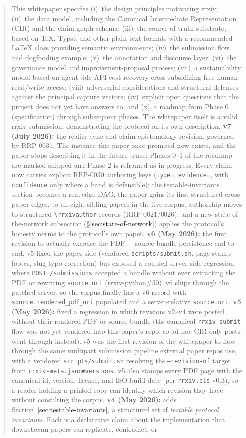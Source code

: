 \documentclass[11pt]{rrxiv}
\begin{document}
\begin{abstract}
\noindent This whitepaper specifies (i)~the design principles motivating rrxiv; (ii)~the data model, including the Canonical Intermediate Representation (CIR) and the claim graph schema; (iii)~the source-of-truth substrate, based on TeX, Typst, and other plain-text formats with a recommended LaTeX class providing semantic environments; (iv)~the submission flow and dogfooding example; (v)~the annotation and discourse layer; (vi)~the governance model and improvement-proposal process; (vii)~a sustainability model based on agent-side API cost recovery cross-subsidizing free human read/write access; (viii)~adversarial considerations and structural defenses against the principal capture vectors; (ix)~explicit open questions that the project does not yet have answers to; and (x)~a roadmap from Phase 0 (specification) through subsequent phases. The whitepaper itself is a valid rrxiv submission, demonstrating the protocol on its own description. \textbf{v7 (July 2026):} the reality-sync and claim-epistemology revision, governed by RRP-0031. The instance this paper once promised now exists, and the paper stops describing it in the future tense: Phases 0--1 of the roadmap are marked shipped and Phase 2 is reframed as in progress. Every claim now carries explicit RRP-0030 authoring keys (\texttt{type=}, \texttt{evidence=}, with \texttt{confidence} only where a band is defensible); the testable-invariants section becomes a real edge DAG; the paper gains its first structured cross-paper edges, to all eight sibling papers in the live corpus; authorship moves to structured \texttt{\textbackslash rrxivauthor} records (RRP-0021/0026); and a new state-of-the-network subsection (\S\ref{sec:state-of-network}) applies the protocol's honesty norms to the protocol's own paper. \textbf{v6 (May 2026):} the first revision to actually exercise the PDF + source-bundle persistence end-to-end. v5 fixed the paper-side (vendored \texttt{scripts/submit.sh}, page-stamp footer, slug typo correction) but exposed a coupled server-side regression where \texttt{POST /submissions} accepted a bundle without ever extracting the PDF or rewriting \texttt{source.uri} (rrxiv-python\#50). v6 ships through the patched server, so the corpus finally has a v6 record with \texttt{source.rendered\_pdf\_uri} populated and a server-relative \texttt{source.uri}. \textbf{v5 (May 2026):} fixed a regression in which revisions v2--v4 were posted without their rendered PDF or source bundle (the canonical \texttt{rrxiv submit} flow was not yet vendored into this paper's repo, so ad-hoc CIR-only posts went through instead). v5 was the first revision of the whitepaper to flow through the same multipart submission pipeline external paper repos use, with a vendored \texttt{scripts/submit.sh} resolving the \texttt{--revision-of} target from \texttt{rrxiv-meta.json\#versions}. v5 also stamps every PDF page with the canonical id, version, license, and ISO build date (per \texttt{rrxiv.cls} v0.3), so a reader holding a printed copy can identify which revision they have without consulting the corpus. \textbf{v4 (May 2026):} adds Section~\ref{sec:testable-invariants}, a structured set of \emph{testable protocol invariants}. Each is a declarative claim about the implementation that downstream papers can replicate, contradict, or 
\end{abstract}
\end{document}
